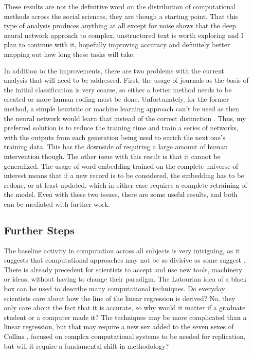 \documentclass[12pt, a4paper]{article}
\begin{document}
These results are not the definitive word on the distribution of computational methods across the social sciences, they are though a starting point. That this type of analysis produces anything at all except for noise shows that the deep neural network approach to complex, unstructured text is worth exploring and I plan to continue with it, hopefully improving accuracy and definitely better mapping out how long these tasks will take. 

In addition to the improvements, there are two problems with the current analysis that will need to be addressed. First, the usage of journals as the basis of the initial classification is very coarse, so either a better method needs to be created or more human coding must be done. Unfortunately, for the former method, a simple heuristic or machine learning approach can't be used as then the neural network would learn that instead of the correct distinction \citep{deep_learning_chapter12}. Thus, my preferred solution is to reduce the training time and train a series of networks, with the outputs from each generation being used to enrich the next one's training data. This has the downside of requiring a large amount of human intervention though. The other issue with this result is that it cannot be generalized. The usage of word embedding trained on the complete universe of interest means that if a new record is to be considered, the embedding has to be redone, or at least updated, which in either case requires a complete retraining of the model. Even with these two issues, there are some useful results, and both can be mediated with further work.

\subsection{Further Steps}

The baseline activity in computation across all subjects is very intriguing, as it suggests that computational approaches may not be as divisive as some suggest \citep{watts2007twenty}\citep{lazer2009life}. There is already precedent for scientists to accept and use new tools, machinery or ideas, without having to change their paradigm. The Latourian idea of a black box \citep{latour1987science} can be used to describe many computational techniques. Do everyday scientists care about how the line of the linear regression is derived? No, they only care about the fact that it is accurate, so why would it matter if a graduate student or a computer made it? The techniques may be more complicated than a linear regression, but that may require a new sex added to the seven sexes of Collins \citep{collins1975seven}, focused on complex computational systems to be needed for replication, but will it require a fundamental shift in methodology? 
\end{document}
